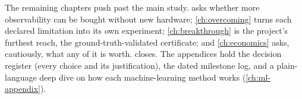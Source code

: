 The remaining chapters push past the main study.  asks whether more
observability can be bought without new hardware; \cref{ch:overcoming} turns each declared
limitation into its own experiment; \cref{ch:breakthrough} is the project's furthest reach,
the ground-truth-validated certificate; and \cref{ch:economics} asks, cautiously, what any of
it is worth.  closes. The appendices hold the decision register (every
choice and its justification), the dated milestone log, and a plain-language deep dive on how
each machine-learning method works (\cref{ch:ml-appendix}).
